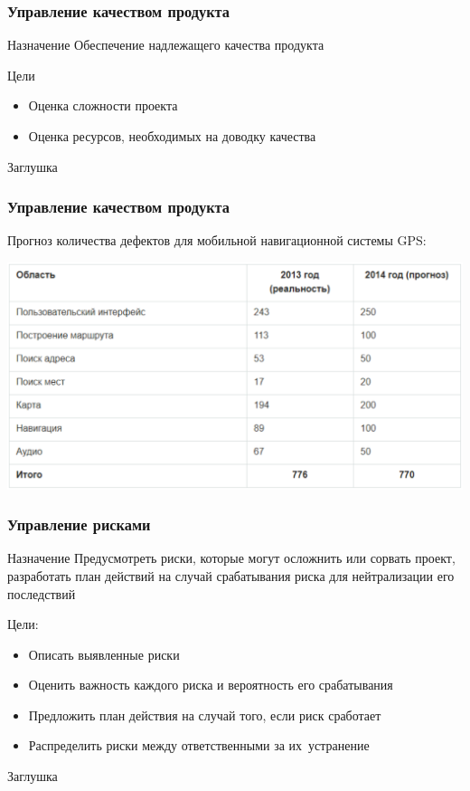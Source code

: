 \documentclass{../industrial-development}
\begin{document}
    \begin{frame} \frametitle{Управление качеством продукта}
        \begin{block}{Назначение}
            Обеспечение надлежащего качества продукта
        \end{block}
        Цели
        \begin{itemize}
            \item Оценка сложности проекта
            \item Оценка ресурсов, необходимых на доводку качества
        \end{itemize}
    \end{frame}
    \lecturenotes
    Заглушка

    \begin{frame} \frametitle{Управление качеством продукта}
        Прогноз количества дефектов для мобильной навигационной системы GPS:
        \centerline{\includegraphics[width=1\textwidth]{gpstable1.pdf}}
    \end{frame}

    \begin{frame} \frametitle{Управление рисками}
        \begin{block}{Назначение}
            Предусмотреть риски, которые могут осложнить или сорвать проект, разработать план действий на случай срабатывания риска для нейтрализации его последствий
        \end{block}
        Цели:
        \begin{itemize}
            \item Описать выявленные риски
            \item Оценить важность каждого риска и вероятность его срабатывания
            \item Предложить план действия на случай того, если риск сработает
            \item Распределить риски между ответственными за их~устранение
        \end{itemize}
    \end{frame}
    \lecturenotes
    Заглушка
\end{document}
